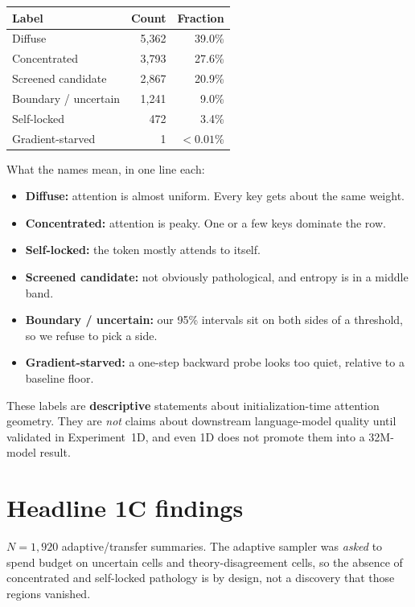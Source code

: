 \documentclass[11pt,a4paper]{report}
\begin{document}
\begin{center}
\begin{tabular}{lrr}
\toprule
Label & Count & Fraction \\
\midrule
Diffuse & 5{,}362 & 39.0\% \\
Concentrated & 3{,}793 & 27.6\% \\
Screened candidate & 2{,}867 & 20.9\% \\
Boundary / uncertain & 1{,}241 & 9.0\% \\
Self-locked & 472 & 3.4\% \\
Gradient-starved & 1 & $<0.01$\% \\
\bottomrule
\end{tabular}
\end{center}

What the names mean, in one line each:
\begin{itemize}[leftmargin=*]
  \item \textbf{Diffuse:} attention is almost uniform. Every key gets about the same weight.
  \item \textbf{Concentrated:} attention is peaky. One or a few keys dominate the row.
  \item \textbf{Self-locked:} the token mostly attends to itself.
  \item \textbf{Screened candidate:} not obviously pathological, and entropy is in a middle band.
  \item \textbf{Boundary / uncertain:} our 95\% intervals sit on both sides of a threshold, so we refuse to pick a side.
  \item \textbf{Gradient-starved:} a one-step backward probe looks too quiet, relative to a baseline floor.
\end{itemize}

These labels are \textbf{descriptive} statements about initialization-time attention geometry. They are \emph{not} claims about downstream language-model quality until validated in Experiment~1D, and even 1D does not promote them into a 32M-model result.

\section{Headline 1C findings}

$N=1{,}920$ adaptive/transfer summaries. The adaptive sampler was \emph{asked} to spend budget on uncertain cells and theory-disagreement cells, so the absence of concentrated and self-locked pathology is by design, not a discovery that those regions vanished.
\end{document}
